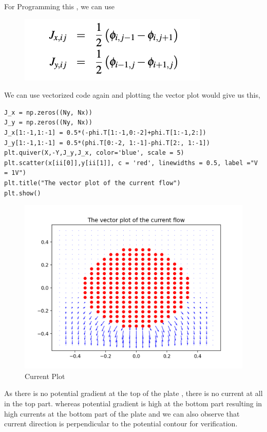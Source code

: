 \documentclass[12pt, a4paper]{report}
\begin{document}
For Programming this , we can use 
\begin{figure}[!tbh]
   	\centering
   	\includegraphics[scale=0.94]{G.png}
 \end{figure} 
We can use vectorized code again and plotting the vector plot would give us this,
\begin{Verbatim}
J_x = np.zeros((Ny, Nx))
J_y = np.zeros((Ny, Nx))
J_x[1:-1,1:-1] = 0.5*(-phi.T[1:-1,0:-2]+phi.T[1:-1,2:])
J_y[1:-1,1:-1] = 0.5*(phi.T[0:-2, 1:-1]-phi.T[2:, 1:-1])
plt.quiver(X,-Y,J_y,J_x, color='blue', scale = 5)
plt.scatter(x[ii[0]],y[ii[1]], c = 'red', linewidths = 0.5, label ="V = 1V")
plt.title("The vector plot of the current flow")
plt.show()

\end{Verbatim}

\begin{figure}[!tbh]
   	\centering
   	\includegraphics[scale=0.75]{Q6.png}
   	\caption{Current Plot}
   	\label{fig:allgraphs}
 \end{figure} 

As there is no potential gradient at the top of the plate , there is no current at all in the top part. whereas potential gradient is high at the bottom part resulting in high currents at the bottom part of the plate and we can also observe that current direction is perpendicular to the potential contour for verification.
\end{document}
